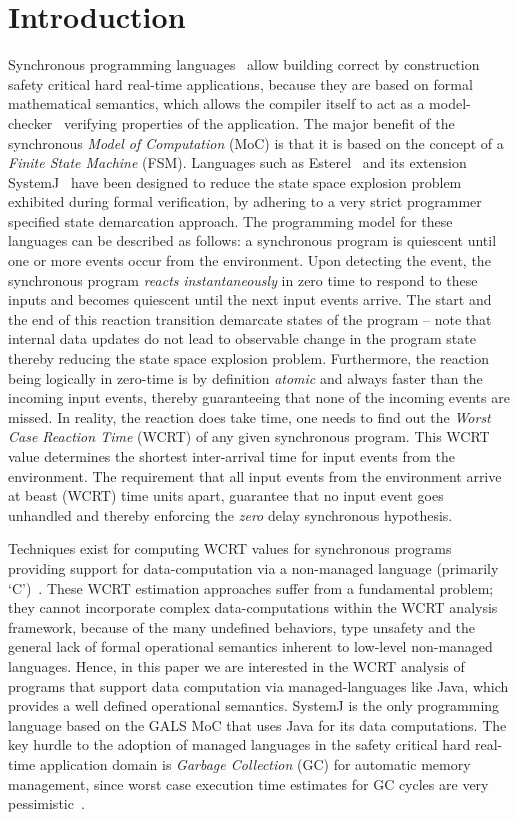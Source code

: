\section{Introduction}
\label{sec:introduction}

Synchronous programming languages~\cite{berry92} allow building correct
by construction safety critical hard real-time applications, because
they are based on formal mathematical semantics, which allows the
compiler itself to act as a model-checker~\cite{jagadeesan1995safety}
verifying properties of the application. The major benefit of the
synchronous \textit{Model of Computation} (MoC) is that it is based on
the concept of a \textit{Finite State Machine} (FSM). Languages such as
Esterel~\cite{berry92} and its extension SystemJ~\cite{amal10} have been
designed to reduce the state space explosion problem exhibited during
formal verification, by adhering to a very strict programmer specified
state demarcation approach. The programming model for these languages
can be described as follows: a synchronous program is quiescent until
one or more events occur from the environment. Upon detecting the event,
the synchronous program \textit{reacts} \textit{instantaneously} in zero
time to respond to these inputs and becomes quiescent until the next
input events arrive. The start and the end of this reaction transition
demarcate states of the program -- note that internal data updates do
not lead to {\color{red} observable} change in the program state thereby
reducing the state space explosion problem. Furthermore, the reaction
being logically in zero-time is by definition \textit{atomic} and always
faster than the incoming input events, thereby guaranteeing that none of
the incoming events are missed. In reality, the reaction does take time,
one needs to find out the \textit{Worst Case Reaction Time} (WCRT) of
any given synchronous program. This WCRT value determines the shortest
inter-arrival time for input events from the environment. {\color{red}
  The requirement that all input events from the environment arrive at
  beast (WCRT) time units apart, guarantee that no input event goes
  unhandled and thereby enforcing the \textit{zero} delay synchronous
  hypothesis.}

Techniques exist for computing WCRT values for synchronous programs
providing support for data-computation via a non-managed language
(primarily `C')~\cite{boldt07,proop10}. These WCRT estimation approaches
suffer from a fundamental problem; they cannot incorporate complex
data-computations within the WCRT analysis framework, because of the
many undefined behaviors, type unsafety and the general lack of formal
operational semantics inherent to low-level non-managed
languages. Hence, in this paper we are interested in the WCRT analysis
of programs that support data computation via managed-languages like
Java, which provides a well defined operational semantics. {\color{red}
  SystemJ is the only programming language based on the GALS MoC that
  uses Java for its data computations.} The key hurdle to the adoption
of managed languages in the safety critical hard real-time application
domain is \textit{Garbage Collection} (GC) for automatic memory
management, since worst case execution time estimates for GC cycles are
very pessimistic~\cite{puffitsch2013design}.

